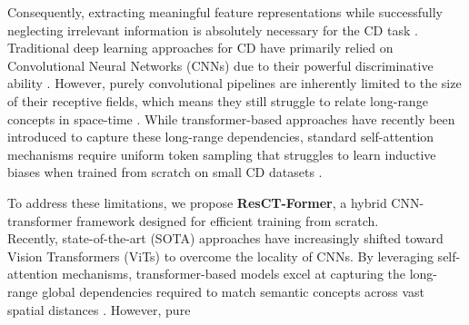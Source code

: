 \documentclass[conference]{IEEEtran}
\begin{document}
Consequently, extracting meaningful feature representations while successfully neglecting irrelevant information is absolutely necessary for the CD task \cite{scratchformer2024}. Traditional deep learning approaches for CD have primarily relied on Convolutional Neural Networks (CNNs) due to their powerful discriminative ability \cite{bit2021}. However, purely convolutional pipelines are inherently limited to the size of their receptive fields, which means they still struggle to relate long-range concepts in space-time \cite{bit2021}. While transformer-based approaches have recently been introduced to capture these long-range dependencies, standard self-attention mechanisms require uniform token sampling that struggles to learn inductive biases when trained from scratch on small CD datasets \cite{scratchformer2024}.

To address these limitations, we propose \textbf{ResCT-Former}, a hybrid CNN-transformer framework designed for efficient training from scratch.\\

Recently, state-of-the-art (SOTA) approaches have increasingly shifted toward Vision Transformers (ViTs) to overcome the locality of CNNs. By leveraging self-attention mechanisms, transformer-based models excel at capturing the long-range global dependencies required to match semantic concepts across vast spatial distances \cite{bit2021}. However, pure 
\end{document}
